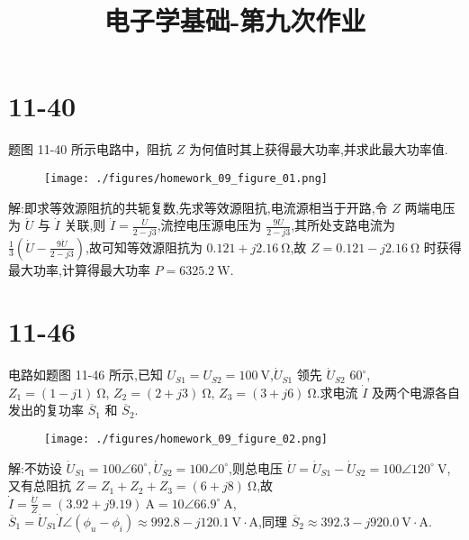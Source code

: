 
\usepackage{../../homeworks_preamble}
\title{电子学基础-第九次作业}


    \maketitle
    \section{11-40} 题图 11-40 所示电路中，阻抗 $Z$ 为何值时其上获得最大功率,并求此最大功率值.
    \begin{figure}[htbp]
        \centering
        \texttt{[image: ./figures/homework\_09\_figure\_01.png]}
    \end{figure}
    
    解:即求等效源阻抗的共轭复数,先求等效源阻抗,电流源相当于开路,令 $Z$ 两端电压为 $\dot{U}$ 与 $\dot{I}$ 关联,则 $\dot{I}=\frac{\dot{U}}{2-j 3} $,流控电压源电压为 $\frac{9 \dot{U}}{2-j 3}$,其所处支路电流为 $\frac{1}{3}\left( {\dot{U}-\frac{9 \dot{U}}{2-j 3}}  \right)$,故可知等效源阻抗为 $0.121+j 2.16 \ \mathrm{\Omega}$,故 $Z=0.121-j 2.16 \ \mathrm{\Omega}$ 时获得最大功率,计算得最大功率 $P=6325.2 \ \mathrm{W}$.
    \section{11-46} 电路如题图 11-46 所示,已知 $U_{S 1}=U_{S 2}=100 \ \mathrm{V}$,$\dot{U}_{S 1}$ 领先 $\dot{U}_{S 2}$ $60^{\circ}$, $Z_1=\left( 1-j 1 \right) \ \mathrm{\Omega}$, $Z_2=\left( 2+j 3 \right) \ \mathrm{\Omega}$, $Z_3=\left( 3+j 6 \right) \ \mathrm{\Omega}$.求电流 $\dot{I}$ 及两个电源各自发出的复功率 $\overline{S}_{1}$ 和 $\overline{S}_{2}$.
    \begin{figure}[htbp]
        \centering
        \texttt{[image: ./figures/homework\_09\_figure\_02.png]}
    \end{figure}
    \newpage

    解:不妨设 $\dot{U}_{S1}=100\angle 60^{\circ},\dot{U}_{S2}=100\angle 0^{\circ}$,则总电压 $\dot{U}=\dot{U}_{S1}-\dot{U}_{S2}=100\angle 120^{\circ} \ \mathrm{V}$,又有总阻抗 $Z=Z_1+Z_2+Z_3=\left( 6+j 8 \right) \ \mathrm{\Omega}$,故 $\dot{I}=\frac{\dot{U}}{Z}=\left( 3.92+ j9.19\right) \ \mathrm{A}=10\angle 66.9^{\circ} \ \mathrm{A}$, $\overline{S}_{1}=\dot{U}_{S 1}\dot{I}\angle\left(\phi_{u}-\phi_{i} \right) \approx 992.8-j 120.1 \ \mathrm{V\cdot A}$,同理 $\overline{S}_{2}\approx 392.3-j 920.0 \ \mathrm{V\cdot A}$.
    
